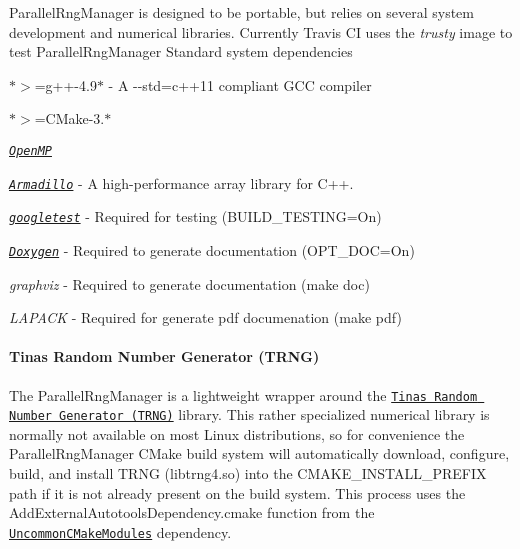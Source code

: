Parallel\+Rng\+Manager is designed to be portable, but relies on several system development and numerical libraries. Currently Travis CI uses the {\itshape trusty} image to test Parallel\+Rng\+Manager Standard system dependencies
\begin{DoxyItemize}
\item $\ast$$>$=g++-\/4.9$\ast$ -\/ A {\ttfamily -\/-\/std=c++11} compliant G\+CC compiler
\item $\ast$$>$=C\+Make-\/3.$\ast$
\item \href{https://www.openmp.org/}{\tt {\itshape Open\+MP}}
\item \href{http://arma.sourceforge.net/docs.html}{\tt {\itshape Armadillo}} -\/ A high-\/performance array library for C++.
\item \href{https://github.com/google/googletest}{\tt {\itshape googletest}} -\/ Required for testing ({\ttfamily B\+U\+I\+L\+D\+\_\+\+T\+E\+S\+T\+I\+NG=On})
\item \href{https://github.com/google/googletest}{\tt {\itshape Doxygen}} -\/ Required to generate documentation ({\ttfamily O\+P\+T\+\_\+\+D\+OC=On})
\begin{DoxyItemize}
\item {\itshape graphviz} -\/ Required to generate documentation ({\ttfamily make doc})
\item {\itshape L\+A\+P\+A\+CK} -\/ Required for generate pdf documenation ({\ttfamily make pdf})
\end{DoxyItemize}
\end{DoxyItemize}

\paragraph*{Tina\textquotesingle{}s Random Number Generator (T\+R\+NG)}

The Parallel\+Rng\+Manager is a lightweight wrapper around the \href{https://www.numbercrunch.de/trng/}{\tt Tina\textquotesingle{}s Random Number Generator (T\+R\+NG)} library. This rather specialized numerical library is normally not available on most Linux distributions, so for convenience the Parallel\+Rng\+Manager C\+Make build system will automatically download, configure, build, and install T\+R\+NG ({\ttfamily libtrng4.\+so}) into the {\ttfamily C\+M\+A\+K\+E\+\_\+\+I\+N\+S\+T\+A\+L\+L\+\_\+\+P\+R\+E\+F\+IX} path if it is not already present on the build system. This process uses the {\ttfamily Add\+External\+Autotools\+Dependency.\+cmake} function from the \href{https://github.com/markjolah/UncommonCMakeModules}{\tt Uncommon\+C\+Make\+Modules} dependency.


